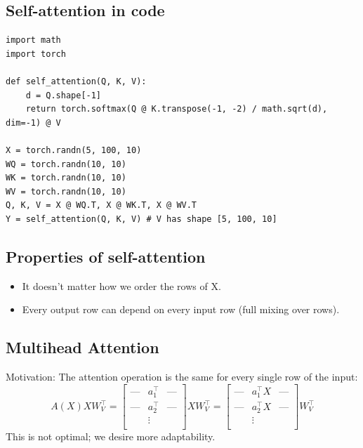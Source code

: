 \documentclass{article}
\begin{document}
\subsection*{Self-attention in code}
\begin{verbatim}
import math
import torch

def self_attention(Q, K, V):
    d = Q.shape[-1]
    return torch.softmax(Q @ K.transpose(-1, -2) / math.sqrt(d), dim=-1) @ V

X = torch.randn(5, 100, 10)
WQ = torch.randn(10, 10)
WK = torch.randn(10, 10)
WV = torch.randn(10, 10)
Q, K, V = X @ WQ.T, X @ WK.T, X @ WV.T
Y = self_attention(Q, K, V) # V has shape [5, 100, 10]
\end{verbatim}

\subsection*{Properties of self-attention}
\begin{itemize}
    \item It doesn't matter how we order the rows of X.
    \item Every output row can depend on every input row (full mixing over rows).
\end{itemize}

\subsection*{Multihead Attention}
Motivation: The attention operation is the same for every single row of the input:
    $$A(X) X W_V^\intercal = \begin{bmatrix}
        \text{---} & a_1^\intercal & \text{---} \\
        \text{---} & a_2^\intercal & \text{---} \\
        &\vdots&\\
    \end{bmatrix} X W_V^\intercal = \begin{bmatrix}
        \text{---} & a_1^\intercal X & \text{---} \\
        \text{---} & a_2^\intercal X & \text{---} \\
        &\vdots&\\
    \end{bmatrix} W_V^\intercal$$
This is not optimal; we desire more adaptability.
\end{document}
